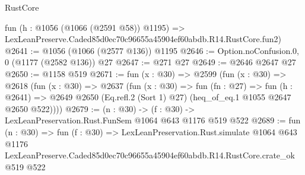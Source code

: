 \begin{lexlean}{RustCore}
\begin{coremodule}
    fun (h : @1056 (@1066 (@2591 @58)) @1195) =>
    LexLeanPreserve.Caded85d0ec70c96655a45904ef60abdb.R14.RustCore.fun2)
@2641 := @1056 (@1066 (@2577 @136)) @1195
@2646 := Option.noConfusion.{0, 0} (@1177 (@2582 @136)) @27
@2647 := @271 @27
@2649 := @2646 @2647 @27
@2650 := @1158 @519
@2671 := fun (x : @30) =>
  @2599
    (fun (x : @30) =>
    @2618
      (fun (x : @30) =>
      @2637
        (fun (x : @30) =>
        fun (fn : @27) =>
        fun (h : @2641) =>
        @2649 @2650 (Eq.refl.{2} (Sort 1) @27) (heq_of_eq.{1} @1055 @2647 @2650 @522))))
@2679 := (n : @30) -> (f : @30) -> LexLeanPreservation.Rust.FunSem @1064 @643 @1176 @519 @522
@2689 := fun (n : @30) =>
  fun (f : @30) =>
  LexLeanPreservation.Rust.simulate
    @1064
    @643
    @1176
    LexLeanPreserve.Caded85d0ec70c96655a45904ef60abdb.R14.RustCore.crate_ok
    @519
    @522
\end{coremodule}
\end{lexlean}
